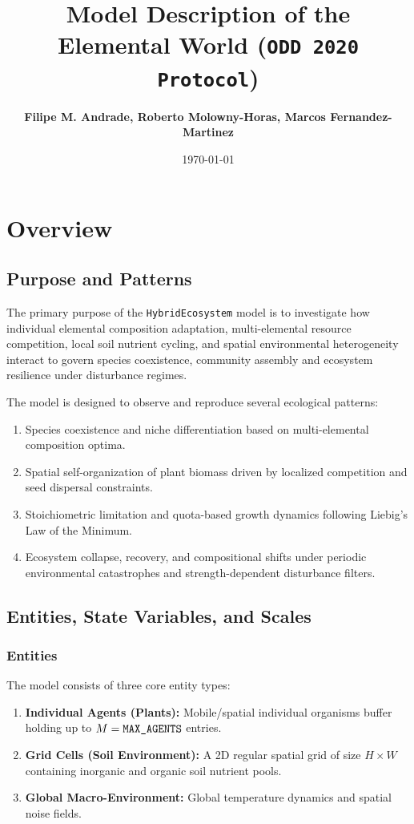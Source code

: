 \documentclass[11pt,a4paper]{article}
\title{\textbf{Model Description of the Elemental World (\texttt{ODD 2020 Protocol})}}
\author{\textbf{Filipe M. Andrade, Roberto Molowny-Horas, Marcos Fernandez-Martinez}}
\date{\today}
\begin{document}
\maketitle

\abstract{

}

\section{Overview}

\subsection{Purpose and Patterns}
The primary purpose of the \texttt{HybridEcosystem} model is to investigate how individual elemental composition  adaptation, multi-elemental resource competition, local soil nutrient cycling, and spatial environmental heterogeneity interact to govern species coexistence, community assembly and ecosystem resilience under disturbance regimes.

The model is designed to observe and reproduce several ecological patterns:

\begin{enumerate}
    \item Species coexistence and niche differentiation based on multi-elemental composition optima.
    \item Spatial self-organization of plant biomass driven by localized competition and seed dispersal constraints.
    \item Stoichiometric limitation and quota-based growth dynamics following Liebig's Law of the Minimum.
    \item Ecosystem collapse, recovery, and compositional shifts under periodic environmental catastrophes and strength-dependent disturbance filters.
\end{enumerate}

\subsection{Entities, State Variables, and Scales}

\subsubsection{Entities}
The model consists of three core entity types:
\begin{enumerate}
    \item \textbf{Individual Agents (Plants):} Mobile/spatial individual organisms buffer holding up to $M = \text{\texttt{MAX\_AGENTS}}$ entries.
    \item \textbf{Grid Cells (Soil Environment):} A 2D regular spatial grid of size $H \times W$ containing inorganic and organic soil nutrient pools.
    \item \textbf{Global Macro-Environment:} Global temperature dynamics and spatial noise fields.
\end{enumerate}
\end{document}
